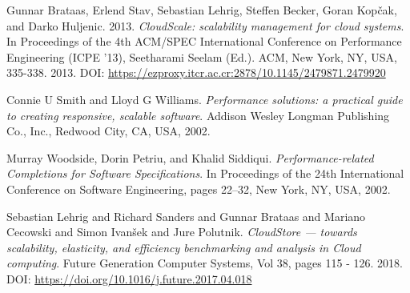 \documentclass[11pt, twoside]{report}
\begin{document}
\begin{thebibliography}{9}
 Gunnar Brataas, Erlend Stav, Sebastian Lehrig, Steffen Becker, Goran Kopčak, and Darko Huljenic. 2013. \emph{CloudScale: scalability management for cloud systems}. In Proceedings of the 4th ACM/SPEC International Conference on Performance Engineering (ICPE '13), Seetharami Seelam (Ed.). ACM, New York, NY, USA, 335-338. 2013. DOI: \url{https://ezproxy.itcr.ac.cr:2878/10.1145/2479871.2479920}

 Connie U Smith and Lloyd G Williams. \emph{Performance solutions: a practical guide to creating responsive, scalable software}. Addison Wesley Longman Publishing Co., Inc., Redwood City, CA, USA, 2002.

 Murray Woodside, Dorin Petriu, and Khalid Siddiqui. \emph{Performance-related Completions for Software Specifications}. In Proceedings of the 24th International Conference on Software Engineering, pages 22–32, New York, NY, USA, 2002.

 Sebastian Lehrig and Richard Sanders and Gunnar Brataas and Mariano Cecowski and Simon Ivanšek and Jure Polutnik. \emph{CloudStore — towards scalability, elasticity, and efficiency benchmarking and analysis in Cloud computing}. Future Generation Computer Systems, Vol 38, pages 115 - 126. 2018. DOI: \url{https://doi.org/10.1016/j.future.2017.04.018} 

\end{thebibliography}
\end{document}
